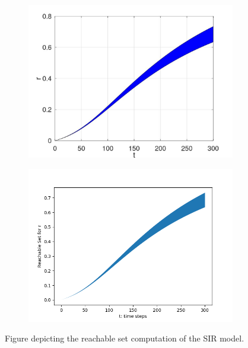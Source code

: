 \documentclass[EPiC]{easychair}
\begin{document}
\begin{figure}[h]
    \begin{subfigure}{0.47\textwidth}
    \centering
    \includegraphics[width=\textwidth]{SapoFigures/SIR/SapoSIR_R.jpg}
    \end{subfigure}
    \begin{subfigure}{0.47\textwidth}
    \centering
    \includegraphics[width=1.2\textwidth]{SapoFigures/SIR/KaaSIR_R.png}
    \end{subfigure}
    
    \caption{Figure depicting the reachable set computation of the SIR model.} 
    \label{fig1}
\end{figure}
\end{document}
